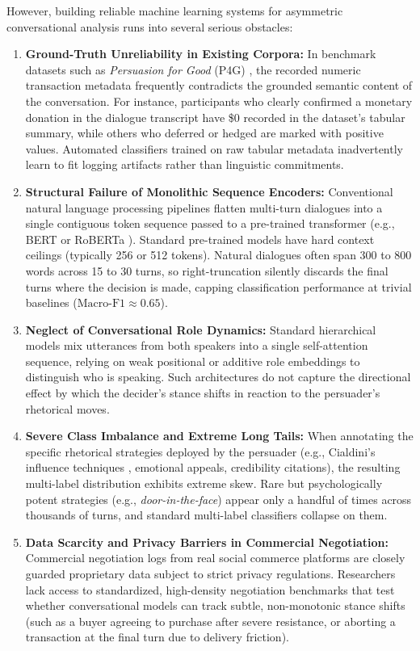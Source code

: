 However, building reliable machine learning systems for asymmetric conversational analysis runs into several serious obstacles:
\begin{enumerate}[label=(\alph*)]
  \item \textbf{Ground-Truth Unreliability in Existing Corpora:} In benchmark datasets such as \textit{Persuasion for Good} (P4G) \cite{wang2019persuasion}, the recorded numeric transaction metadata frequently contradicts the grounded semantic content of the conversation. For instance, participants who clearly confirmed a monetary donation in the dialogue transcript have \$0 recorded in the dataset's tabular summary, while others who deferred or hedged are marked with positive values. Automated classifiers trained on raw tabular metadata inadvertently learn to fit logging artifacts rather than linguistic commitments.
  \item \textbf{Structural Failure of Monolithic Sequence Encoders:} Conventional natural language processing pipelines flatten multi-turn dialogues into a single contiguous token sequence passed to a pre-trained transformer (e.g., BERT \cite{devlin2019bert} or RoBERTa \cite{liu2019roberta}). Standard pre-trained models have hard context ceilings (typically 256 or 512 tokens). Natural dialogues often span 300 to 800 words across 15 to 30 turns, so right-truncation silently discards the final turns where the decision is made, capping classification performance at trivial baselines ($\text{Macro-F1} \approx 0.65$).
  \item \textbf{Neglect of Conversational Role Dynamics:} Standard hierarchical models mix utterances from both speakers into a single self-attention sequence, relying on weak positional or additive role embeddings to distinguish who is speaking. Such architectures do not capture the directional effect by which the decider's stance shifts in reaction to the persuader's rhetorical moves.
  \item \textbf{Severe Class Imbalance and Extreme Long Tails:} When annotating the specific rhetorical strategies deployed by the persuader (e.g., Cialdini's influence techniques \cite{cialdini2001influence}, emotional appeals, credibility citations), the resulting multi-label distribution exhibits extreme skew. Rare but psychologically potent strategies (e.g., \textit{door-in-the-face}) appear only a handful of times across thousands of turns, and standard multi-label classifiers collapse on them.
  \item \textbf{Data Scarcity and Privacy Barriers in Commercial Negotiation:} Commercial negotiation logs from real social commerce platforms are closely guarded proprietary data subject to strict privacy regulations. Researchers lack access to standardized, high-density negotiation benchmarks that test whether conversational models can track subtle, non-monotonic stance shifts (such as a buyer agreeing to purchase after severe resistance, or aborting a transaction at the final turn due to delivery friction).
\end{enumerate}

